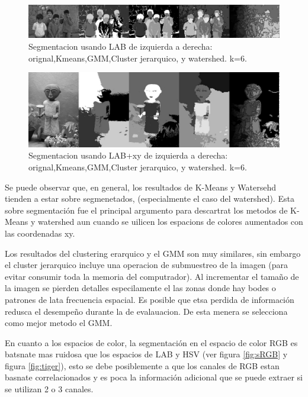 \documentclass[10pt,twocolumn,letterpaper]{article}
\begin{document}
\begin{figure}
\begin{center}
\includegraphics[width=0.95\linewidth]
                   {img/LABSample.jpg}
\end{center}
   \caption{Segmentacion usando LAB de izquierda a derecha: orignal,Kmeans,GMM,Cluster jerarquico, y watershed. k=6.}
\label{fig:SLAB}
\end{figure}

\begin{figure}
\begin{center}
\includegraphics[width=0.95\linewidth]
                   {img/LABXYSample.jpg}
\end{center}
   \caption{Segmentacion usando LAB+xy de izquierda a derecha: orignal,Kmeans,GMM,Cluster jerarquico, y watershed. k=6.}
\label{fig:SLABXY}
\end{figure}


Se puede observar que, en general, los resultados de K-Means y Watersehd tienden a estar sobre segmenetados, (especialmente el caso del watershed). Esta sobre segmentación fue el principal argumento para descartrat los metodos de K-Means y watershed aun cuando se uilicen los espacions de colores aumentados con las coordenadas xy.

Los resultados del clustering erarquico y el GMM son muy similares, sin embargo el cluster jerarquico incluye una operacion de submuestreo de la imagen (para evitar consumir toda la memoria del computrador). Al incrementar el tamaño de la imagen se pierden detalles especilamente el las zonas donde hay bodes o patrones de lata frecuencia espacial. Es posible que etsa perdida de información redusca el desempeño durante la de evalauacion. De esta menera se selecciona como mejor metodo el GMM.

En cuanto a los espacios de color, la segmentación en el espacio de color RGB es batsnate mas ruidosa que los espacios de LAB y HSV (ver figura \ref{fig:sRGB} y figura \ref{fig:tiger}), esto se debe posiblemente a que los canales de RGB estan basnate correlacionados y es poca la información adicional que se puede extraer si se utilizan 2 o 3 canales.
\end{document}
